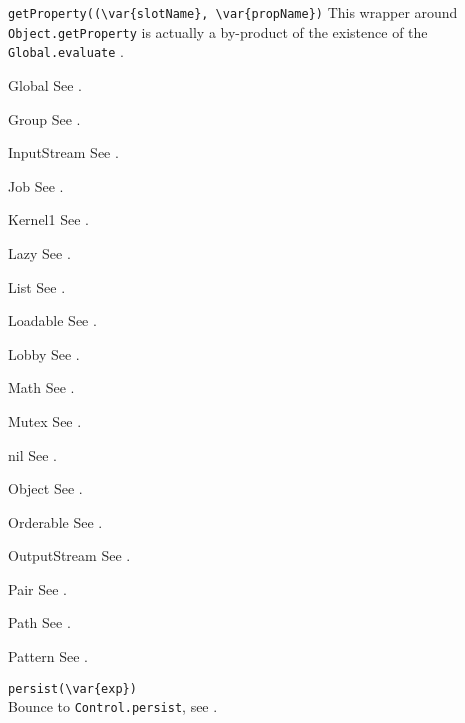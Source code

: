 \begin{urbiscriptapi}
\item \lstinline|getProperty((\var{slotName}, \var{propName})| This
  wrapper around \lstinline|Object.getProperty| is actually a
  by-product of the existence of the \lstinline|Global.evaluate|
  .

\item[Global] See .
\item[Group] See .
\item[InputStream] See .
\item[Job] See .
\item[Kernel1] See .
\item[Lazy] See .
\item[List] See .
\item[Loadable] See .
\item[Lobby] See .
\item[Math] See .
\item[Mutex] See .
\item[nil] See .
\item[Object] See .
\item[Orderable] See .
\item[OutputStream] See .
\item[Pair] See .
\item[Path] See .
\item[Pattern] See .

\item \lstinline|persist(\var{exp})|\\
  Bounce to \lstinline|Control.persist|, see .


\end{urbiscriptapi}
